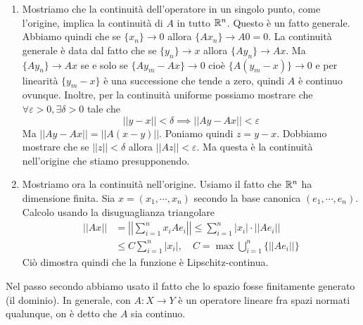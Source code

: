 \documentclass[a4paper]{article}
\begin{document}
\begin{snippetproof}{}
    \begin{enumerate}
        \item Mostriamo che la continuità dell'operatore in un singolo punto, come l'origine,
        implica la continuità di \(A\) in tutto \(\mathbb{R}^n\). Questo è un fatto generale.
        Abbiamo quindi che se \(\{x_n\} \to 0\)
        allora \(\{Ax_n\} \to A0 = 0\). La continuità generale è data dal fatto che se \(\{y_n\} \to x\)
        allora \(\{Ay_n\} \to Ax\).
        Ma \(\{Ay_n\} \to Ax\) se e solo se \(\{Ay_m - Ax\} \to 0\) cioè \(\{A(y_m - x)\} \to 0\) e
        per linearità \(\{y_m - x\}\) è una successione che tende a zero, quindi \(A\) è continuo ovunque.
        Inoltre, per la continuità uniforme possiamo mostrare che \(\forall \varepsilon > 0, \exists \delta > 0\)
        tale che
        \[
            ||y-x|| < \delta \implies ||Ay - Ax|| < \varepsilon
        \]
        Ma \(||Ay - Ax|| = ||A(x-y)||\).
        Poniamo quindi \(z = y-x\). Dobbiamo mostrare che se \(||z|| < \delta\)
        allora \(||Az|| < \varepsilon\). Ma questa è la continuità nell'origine che stiamo presupponendo.
        \item Mostriamo ora la continuità nell'origine.
        Usiamo il fatto che \(\mathbb{R}^n\) ha dimensione finita.
        Sia \(x = (x_1, \cdots, x_n)\) secondo la base canonica \((e_1, \cdots, e_n)\).
        Calcolo usando la disuguaglianza triangolare
        \begin{align*}
            ||Ax|| &= \left|\left|
                \sum_{i=1}^n x_i A e_i
            \right|\right|
            \leq \sum_{i=1}^n |x_i| \cdot ||Ae_i|| \\
            &\leq C \sum_{i=1}^n |x_i|, \quad C = \max \bigcup_{i=1}^n \{||Ae_i||\}
        \end{align*}
        Ciò dimostra quindi che la funzione è Lipschitz-continua.
    \end{enumerate}
\end{snippetproof}

Nel passo secondo abbiamo usato il fatto che lo spazio fosse finitamente generato (il dominio).
In generale, con \(A \colon X \to Y\) è un operatore lineare fra spazi normati qualunque,
on è detto che \(A\) sia continuo.
\end{document}
